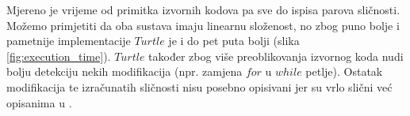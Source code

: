 \noindent Mjereno je vrijeme od primitka izvornih kodova pa sve do ispisa parova sličnosti. Možemo primjetiti da oba sustava imaju linearnu složenost, no zbog puno bolje i pametnije implementacije $Turtle$ je i do pet puta bolji (slika \ref{fig:execution_time}). $Turtle$ također zbog više preoblikovanja izvornog koda nudi bolju detekciju nekih modifikacija (npr. zamjena $for$ u $while$ petlje). Ostatak modifikacija te izračunatih sličnosti nisu posebno opisivani jer su vrlo slični već opisanima u \cite{plagijator}.
